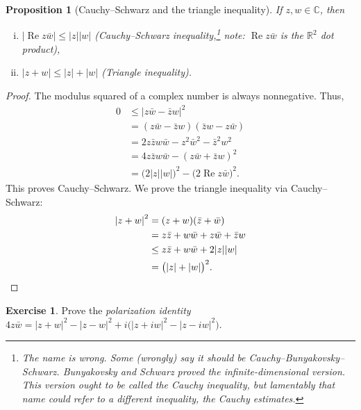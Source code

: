 \documentclass[12pt,openany]{book}
\renewcommand{\Re}{\operatorname{Re}}
\newcommand{\sabs}[1]{\lvert {#1} \rvert}
\newcommand{\C}{{\mathbb{C}}}
\newcommand{\R}{{\mathbb{R}}}
\newcommand{\myindex}[1]{#1\index{#1}}
\theoremstyle{plain}
\newtheorem{prop}[thm]{Proposition}
\theoremstyle{remark}
\theoremstyle{definition}
\newenvironment{exbox}{%
    \def\FrameCommand{\vrule width 1pt \relax\hspace{10pt}}%
    \MakeFramed{\advance\hsize-\width\FrameRestore}%
}{%
    \endMakeFramed
}
\theoremstyle{exercise}
\newtheorem{exercise}{Exercise}[section]
\theoremstyle{example}
\begin{document}
\begin{prop}[Cauchy--Schwarz and the triangle inequality]
If $z,w \in \C$, then
\begin{enumerate}[(i)]
\item
$\sabs{\Re z\bar{w}} \leq \sabs{z} \sabs{w}$ \quad (Cauchy--Schwarz inequality,\footnote{%
The name is wrong.
Some (wrongly) say it should be Cauchy--Bunyakovsky--Schwarz.
Bunyakovsky and Schwarz proved the infinite-dimensional version.
This version ought to be called
the Cauchy inequality, but lamentably that name could refer to a different
inequality, the Cauchy estimates.} note: $\Re z
\bar{w}$ is the $\R^2$ dot product),
\item
$\sabs{z+w} \leq \sabs{z} + \sabs{w}$ \quad (Triangle inequality).%
\end{enumerate}
\end{prop}

\begin{proof}
The modulus squared of a complex number is always nonnegative.
Thus,
\begin{equation*}
\begin{split}
0 & \leq {\sabs{z\bar{w}-\bar{z}w}}^2 \\
  & =    (z\bar{w}-\bar{z}w)(\bar{z}w-z\bar{w}) \\
  & =    2z\bar{z}w\bar{w} - z^2\bar{w}^2 - \bar{z}^2w^2 \\
  & =    4z\bar{z}w\bar{w} - {(z\bar{w}+\bar{z}w)}^2 \\
  & =    {\bigl(2\sabs{z}\sabs{w}\bigr)}^2 - {\bigl(2 \Re z\bar{w}\bigr)}^2 .
\end{split}
\end{equation*}
This proves Cauchy--Schwarz.  We prove the triangle inequality
via Cauchy--Schwarz:
\begin{equation*}
\begin{split}
{\sabs{z+w}}^2 & =    (z+w)(\bar{z}+\bar{w}) \\
               & =    z\bar{z} + w\bar{w} + z\bar{w} + \bar{z}w \\
               & \leq z\bar{z} + w\bar{w} + 2 \sabs{z}\sabs{w} \\
               & =    {\bigl(\sabs{z}+\sabs{w}\bigr)}^2 . \qedhere
\end{split}
\end{equation*}
\end{proof}

\begin{exbox}
\begin{exercise}
Prove the \emph{\myindex{polarization identity}}
$4 z\bar{w} =
{\sabs{z+w}}^2-{\sabs{z-w}}^2 +i \bigl( {\sabs{z+iw}}^2 - {\sabs{z-iw}}^2 \bigr)$.
\end{exercise}
\end{exbox}
\end{document}
